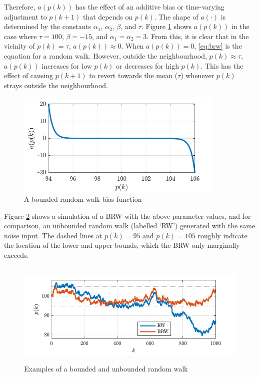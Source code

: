 {Therefore, $a(p(k))$ has the effect of an additive bias or time-varying adjustment to $p(k+1)$ that depends on $p(k)$. The shape of $a(\cdot)$ is determined by the constants $\alpha_{1}$,  $\alpha_{2}$, $\beta$, and $\tau$. Figure \ref{fig:brw-a} shows $a(p(k))$ in the case where $\tau=100$, $\beta=-15$, and $\alpha_{1}=\alpha_{2}=3$.  From this, it is clear that in the vicinity of $p(k)=\tau$, $a(p(k))\approx0$. When $a(p(k))=0$, \eqref{eq:brw} is the equation for a random walk. However, outside the neighbourhood, $p(k) \approx \tau$, $a(p(k))$ increases for low $p(k)$ or decreases for high $p(k)$. This has the effect of causing $p(k+1)$ to revert towards the mean ($\tau$) whenever $p(k)$ strays outside the neighbourhood. 
\begin{figure}[ht]
	\centering
	\includegraphics[height=5cm]{images/brw_a.pdf}
	\caption{A bounded random walk bias function}
	\label{fig:brw-a}
\end{figure}

Figure \ref{fig:brw-sim} shows a simulation of a \gls{BRW} with the above parameter values, and for comparison, an unbounded random walk (labelled `RW') generated with the same noise input. The dashed lines at $p(k)=95$ and $p(k)=105$ roughly indicate the location of the lower and upper bounds, which the \gls{BRW} only marginally exceeds.
\begin{figure}[ht]
	\centering
	\includegraphics[height=5cm]{images/brw_sim.pdf}
	\caption{Examples of a bounded and unbounded random walk}
	\label{fig:brw-sim}
\end{figure}

}
